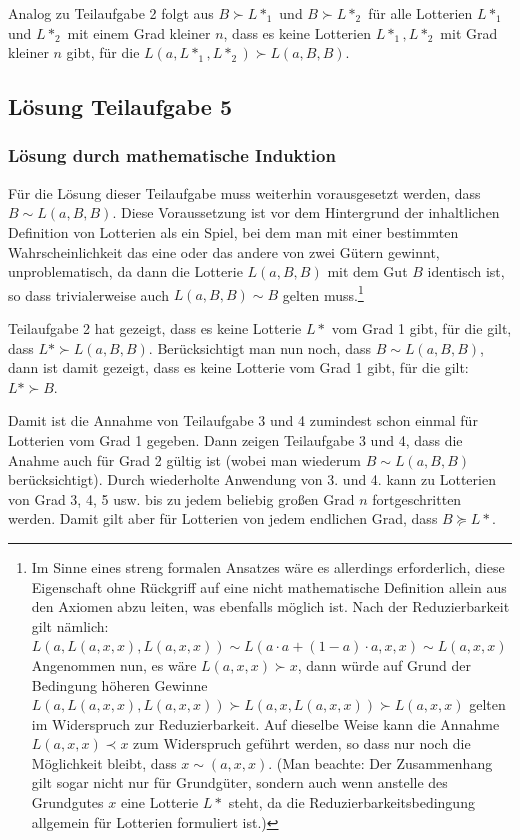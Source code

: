 \documentclass[10pt, a4paper, german]{article}
\numberwithin {equation}{section}
\begin{document}
Analog zu Teilaufgabe 2 folgt aus $B \succ L*_1$ und $B \succ L*_2$
für alle Lotterien $L*_1$ und $L*_2$ mit einem Grad kleiner $n$, dass
es keine Lotterien $L*_1, L*_2$ mit Grad kleiner $n$ gibt, für die
$L(a,L*_1,L*_2) \succ L(a,B,B)$.

\subsection{Lösung Teilaufgabe 5}

\subsubsection{Lösung durch mathematische Induktion}

Für die Lösung dieser Teilaufgabe muss weiterhin vorausgesetzt werden,
dass $B \sim L(a,B,B)$. Diese Voraussetzung ist vor dem Hintergrund
der inhaltlichen Definition von Lotterien als ein Spiel, bei dem man
mit einer bestimmten Wahrscheinlichkeit das eine oder das andere von
zwei Gütern gewinnt, unproblematisch, da dann die Lotterie $L(a,B,B)$
mit dem Gut $B$ identisch ist, so dass trivialerweise auch $L(a,B,B)
\sim B$ gelten muss.\footnote{\label{simsim}Im Sinne eines streng
  formalen Ansatzes wäre es allerdings erforderlich, diese Eigenschaft
  ohne Rückgriff auf eine nicht mathematische Definition allein aus
  den Axiomen abzu leiten, was ebenfalls möglich ist.  Nach der
  Reduzierbarkeit gilt nämlich: $L(a,L(a,x,x),L(a,x,x)) \sim L(a\cdot
  a + (1-a)\cdot a,x,x) \sim L(a,x,x)$ Angenommen nun, es wäre
  $L(a,x,x) \succ x$, dann würde auf Grund der Bedingung höheren
  Gewinne $L(a,L(a,x,x),L(a,x,x)) \succ L(a,x,L(a,x,x)) \succ
  L(a,x,x)$ gelten im Widerspruch zur Reduzierbarkeit. Auf dieselbe
  Weise kann die Annahme $L(a,x,x) \prec x$ zum Widerspruch geführt
  werden, so dass nur noch die Möglichkeit bleibt, dass $x \sim
  (a,x,x)$. (Man beachte: Der Zusammenhang gilt sogar nicht nur für
  Grundgüter, sondern auch wenn anstelle des Grundgutes $x$ eine
  Lotterie $L*$ steht, da die Reduzierbarkeitsbedingung allgemein für
  Lotterien formuliert ist.)}

\vspace{0.2cm}
Teilaufgabe 2 hat gezeigt, dass es keine Lotterie $L*$ vom Grad 1
gibt, für die gilt, dass $L* \succ L(a,B,B)$. Berücksichtigt man nun
noch, dass $B \sim L(a,B,B)$, dann ist damit gezeigt, dass es keine
Lotterie vom Grad 1 gibt, für die gilt: $L* \succ B$. 

\vspace{0.2cm} Damit ist die Annahme von Teilaufgabe 3 und 4 zumindest
schon einmal für Lotterien vom Grad 1 gegeben. Dann zeigen Teilaufgabe
3 und 4, dass die Anahme auch für Grad 2 gültig ist (wobei man
wiederum $B \sim L(a,B,B)$ berücksichtigt). Durch wiederholte
Anwendung von 3. und 4.  kann zu Lotterien von Grad 3, 4, 5 usw. bis
zu jedem beliebig großen Grad $n$ fortgeschritten werden. Damit gilt
aber für Lotterien von jedem endlichen Grad, dass $B \succeq L*$.
\end{document}
